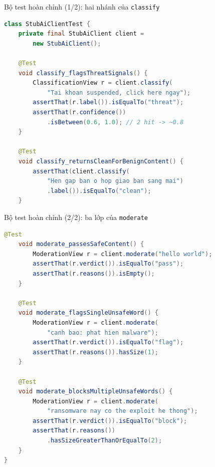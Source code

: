 \documentclass[aspectratio=169,12pt]{beamer}
\begin{document}
\begin{frame}[fragile,shrink=8]{Bộ test hoàn chỉnh (1/2): hai nhánh của \texttt{classify}}
\begin{lstlisting}[language=java]
class StubAiClientTest {
    private final StubAiClient client =
        new StubAiClient();

    @Test
    void classify_flagsThreatSignals() {
        ClassificationView r = client.classify(
            "Tai khoan suspended, click here ngay");
        assertThat(r.label()).isEqualTo("threat");
        assertThat(r.confidence())
            .isBetween(0.6, 1.0); // 2 hit -> ~0.8
    }

    @Test
    void classify_returnsCleanForBenignContent() {
        assertThat(client.classify(
            "Hen gap ban o hop giao ban sang mai")
            .label()).isEqualTo("clean");
    }
\end{lstlisting}
\end{frame}

\begin{frame}[fragile,shrink=8]{Bộ test hoàn chỉnh (2/2): ba lớp của \texttt{moderate}}
\begin{lstlisting}[language=java]
    @Test
    void moderate_passesSafeContent() {
        ModerationView r = client.moderate("hello world");
        assertThat(r.verdict()).isEqualTo("pass");
        assertThat(r.reasons()).isEmpty();
    }

    @Test
    void moderate_flagsSingleUnsafeWord() {
        ModerationView r = client.moderate(
            "canh bao: phat hien malware");
        assertThat(r.verdict()).isEqualTo("flag");
        assertThat(r.reasons()).hasSize(1);
    }

    @Test
    void moderate_blocksMultipleUnsafeWords() {
        ModerationView r = client.moderate(
            "ransomware nay co the exploit he thong");
        assertThat(r.verdict()).isEqualTo("block");
        assertThat(r.reasons())
            .hasSizeGreaterThanOrEqualTo(2);
    }
}
\end{lstlisting}
\end{frame}
\end{document}
